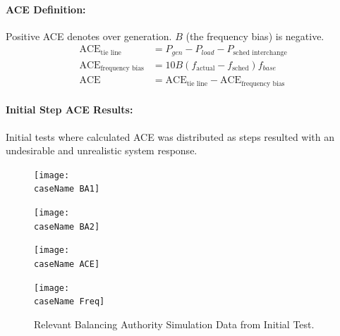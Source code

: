 \documentclass[12pt]{article}
\begin{document}
\pagebreak
\paragraph{ACE Definition:} Positive ACE denotes over generation. $B$ (the frequency bias) is negative.
\begin{align*}
\text{ACE}_{\text{tie line}} &= P_{gen} - P_{load} - P_{\text{sched interchange}}\\
\text{ACE}_{\text{frequency bias}} &= 10B(f_{\text{actual}}-f_{\text{sched}})f_{base}\\
\text{ACE} &= \text{ACE}_{\text{tie line}} -\text{ACE}_{\text{frequency bias}}
\end{align*}

\paragraph{Initial Step ACE Results:} Initial tests where calculated ACE was distributed as steps resulted with an undesirable and unrealistic system response.
\newcommand{\caseName}{SixMachineStepBA}
\newcommand{\testNum}{}
\begin{figure}[h!]
		\centering
		\texttt{[image: \\caseName BA1]}\vspace{-1em}
\end{figure}\vspace{-1.5em}
\begin{figure}[h!]
		\centering
		\texttt{[image: \\caseName BA2]}\vspace{-1em}
\end{figure}\vspace{-1.5em}
\begin{figure}[h!]
		\centering
		\texttt{[image: \\caseName ACE]}\vspace{-1em}
\end{figure}\vspace{-1.5em}
\begin{figure}[h!]
		\centering
		\texttt{[image: \\caseName Freq]}\vspace{-1em}
		\caption{Relevant Balancing Authority Simulation Data from Initial Test.}
		\label{stepTest}		 
\end{figure}\vspace{-1.5em}
\pagebreak
\end{document}
